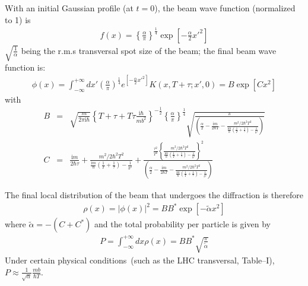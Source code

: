 \documentclass[]{article}
\begin{document}
With an initial Gaussian profile (at $t = 0$), the beam wave function 
(normalized to 1) is
\begin{eqnarray}
f (x) = \left\{ \frac{\alpha}{\pi} \right\}^{\frac{1}{4}}
\exp{\left[- \frac{\alpha}{2} x'^2 \right]}
\end{eqnarray}
%
$\sqrt{\frac{1}{\alpha}}$ being the r.m.s transversal spot size of the 
beam;
the final beam wave function is:
\begin{eqnarray}
\phi (x) 
= 
\int_{- \infty}^{+ \infty} d x'
\left(\frac{\alpha}{\pi} \right)^{\frac{1}{4}}
e^{\left[- \frac{\alpha}{2} x'^2\right]}
K \left(x, T + \tau ; x', 0\right) 
= B \exp{\left[C x^2 \right]}
\label{bw}
\end{eqnarray}
%
with 
\begin{eqnarray}
B & = &
\sqrt{\frac{m}{2 \pi \mathrm{i}\hbar}}
\left\{T + \tau + T \tau \frac{\mathrm{i}\hbar}{m b^2}\right\}^{- \frac{1}{2}}
\left\{\frac{\alpha}{\pi}\right\}^{\frac{1}{4}} 
\sqrt{
\frac{\pi}{
\left(
\frac{\alpha}{2} 
- \frac{\mathrm{i}m}{2 \hbar T} 
- \frac{{m^2}/{2 \hbar^2 T^2}}{
\frac{\mathrm{i}m}{\hbar}\left(\frac{1}{T} + \frac{1}{\tau}\right)
- \frac{1}{b^2}}
\right)
}} \nonumber \\
C & = &
\frac{\mathrm{i}m}{2 \hbar \tau}
+
\frac{{m^2}/{2 \hbar^2 T^2}}{
\frac{\mathrm{i}m}{\hbar}\left(\frac{1}{T} + \frac{1}{\tau}\right)
- \frac{1}{b^2}} 
+
\frac{
\frac{\tau^2}{T^2}
\left\{
\frac{{m^2}/{2 \hbar^2 T^2}}{
\frac{\mathrm{i}m}{\hbar}\left(\frac{1}{T} + \frac{1}{\tau}\right)
- \frac{1}{b^2}} 
\right\}^2}
{
\left(
\frac{\alpha}{2} 
- \frac{\mathrm{i}m}{2 \hbar T} 
- \frac{{m^2}/{2 \hbar^2 T^2}}{
\frac{\mathrm{i}m}{\hbar}\left(\frac{1}{T} + \frac{1}{\tau}\right)
- \frac{1}{b^2}}
\right)
}
\label{BC}
\end{eqnarray}

%
The final local distribution of the beam that undergoes the diffraction is
therefore 
\begin{eqnarray}
\rho (x) = \left| \phi (x) \right|^2 
= B B^{*} \exp{\left[ - \tilde{\alpha} x^2 \right]}
\end{eqnarray}
%
where $\tilde{\alpha} = - (C + C^{*})$ and the total probability per 
particle is given by
\begin{eqnarray}
P = \int_{- \infty} ^{+ \infty} d x \rho ( x ) 
= B B^{*} \sqrt{\frac{\pi}{\tilde{\alpha}}} 
\label{probability}
\end{eqnarray}
%
Under certain physical conditions~(such as the LHC transversal,
Table--I), 
$P \approx \frac{1}{\sqrt{\alpha}} \frac{m b}{\hbar T}$.
\end{document}
